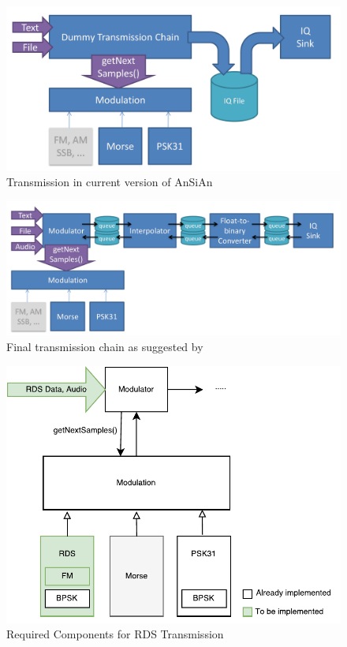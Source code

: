 \begin{figure}
	\centering
	\includegraphics[width=1\linewidth]{gfx/TX_chain_step2.png}
	\caption{Transmission in current version of AnSiAn \cite{Mantz2016}}
	\label{fig:tx_chain_old}
\end{figure}

\begin{figure}
	\centering
	\includegraphics[width=1\linewidth]{gfx/TX_chain_final.png}
	\caption{Final transmission chain as suggested by \cite{Mantz2016}}
	\label{fig:tx_chain_new}
\end{figure}



\begin{figure}
	\centering
	\includegraphics[width=1\linewidth]{gfx/feature2_components.pdf}
	\caption{Required Components for RDS Transmission}
	\label{fig:rds_transmission}
\end{figure}



